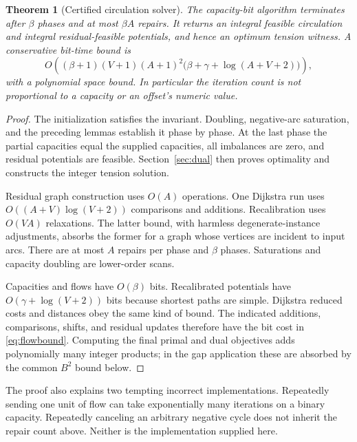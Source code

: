 \documentclass[11pt,letterpaper]{article}
\newtheorem{theorem}{Theorem}[section]
\theoremstyle{definition}
\theoremstyle{remark}\newtheorem{remark}[theorem]{Remark}
\begin{document}
\begin{theorem}[Certified circulation solver]
The capacity-bit algorithm terminates after $\beta$ phases and at most
$\beta A$ repairs. It returns an integral feasible circulation and integral
residual-feasible potentials, and hence an optimum tension witness. A
conservative bit-time bound is
\begin{equation}
 O\!\left((\beta+1)(V+1)(A+1)^2
       \bigl(\beta+\gamma+\log(A+V+2)\bigr)\right),
 \label{eq:flowbound}
\end{equation}
with a polynomial space bound. In particular the iteration count is not
proportional to a capacity or an offset's numeric value.
\end{theorem}
\begin{proof}
The initialization satisfies the invariant. Doubling, negative-arc saturation,
and the preceding lemmas establish it phase by phase. At the last phase the
partial capacities equal the supplied capacities, all imbalances are zero,
and residual potentials are feasible. Section~\ref{sec:dual} then proves
optimality and constructs the integer tension solution.

Residual graph construction uses $O(A)$ operations. One Dijkstra run uses
$O((A+V)\log(V+2))$ comparisons and additions. Recalibration uses $O(VA)$
relaxations. The latter bound, with harmless degenerate-instance adjustments,
absorbs the former for a graph whose vertices are incident to input arcs.
There are at most $A$ repairs per phase and $\beta$ phases. Saturations and
capacity doubling are lower-order scans.

Capacities and flows have $O(\beta)$ bits. Recalibrated potentials have
$O(\gamma+\log(V+2))$ bits because shortest paths are simple. Dijkstra
reduced costs and distances obey the same kind of bound. The indicated
additions, comparisons, shifts, and residual updates therefore have the
bit cost in \eqref{eq:flowbound}. Computing the final primal and dual
objectives adds polynomially many integer products; in the gap application
these are absorbed by the common $B^2$ bound below.
\end{proof}

The proof also explains two tempting incorrect implementations. Repeatedly
sending one unit of flow can take exponentially many iterations on a binary
capacity. Repeatedly canceling an arbitrary negative cycle does not inherit
the repair count above. Neither is the implementation supplied here.
\end{document}
